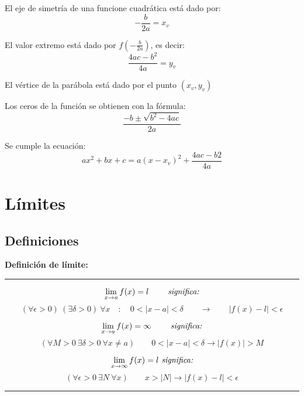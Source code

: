 \documentclass[12pt,a4paper]{extarticle}
\begin{document}
El eje de simetr\'ia de una funcione cuadr\'atica est\'a dado por:
\[
-\frac{b}{2a} = x_v\]

El valor extremo est\'a dado por \(f(-\frac{b}{2a})\), es decir:
\[
\frac{4ac-b^2}{4a} = y_v \]

El v\'ertice de la par\'abola est\'a dado por el punto \( (x_v, y_v)
\)

Los ceros de la funci\'on se obtienen con la f\'ormula:
\[
\frac{-b \pm \sqrt{b^2-4ac}}{2a} \]

Se cumple la ecuaci\'on:
\[
ax^2+bx+c = a(x-x_v)^2+\frac{4ac-b2}{4a} \]
\section{L\'imites}

\subsection{Definiciones}
\begin{minipage}{16cm}
\textbf{Definici\'on de l\'imite:}
\vspace{1em}
\hrule
\vspace{1em}
\[\lim_{x \to a}f(x) = l \qquad \emph{ significa:}\]
\[
(\forall \epsilon > 0) \ (\exists \delta > 0) \ \forall x \quad : \quad 0<|x-a|<
\delta
\qquad  \to \qquad  |f(x) - l| < \epsilon
\]

\vspace{0.5em}
\[ \lim_{x \to a}f(x) = \infty \qquad \emph{ significa:}\]
\[ (\forall M > 0 \ \exists \delta > 0 \ \forall x \neq a) \qquad   0<|x-a| < \delta  \to  |f(x)| >
M
 \]
\vspace{0.5em}

\[ \lim_{x \to \infty}f(x) = l \emph{ significa:} \]
\[ (\forall \epsilon > 0 \ \exists N \ \forall x) \qquad  x > |N|  \to
 |f(x) - l| < \epsilon
 \]
\hrule
\vspace{1em}
\end{minipage}
\end{document}
